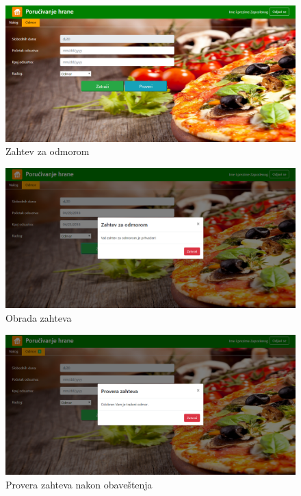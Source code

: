  \begin{figure}[!h]
    \includegraphics[width=1\textwidth]{slike/odmor.png}
    \caption{Zahtev za odmorom} %
    \label{fig:slika_odmor}
\end{figure}
 \begin{figure}[!h]
    \includegraphics[width=1\textwidth]{slike/odmor1.png}
    \caption{Obrada zahteva} %
    \label{fig:slika_obrada1}
\end{figure}

 \begin{figure}[!h]
    \includegraphics[width=1\textwidth]{slike/odmor2.png}
    \caption{Provera zahteva nakon obaveštenja} %
    \label{fig:slika_obrada2}
\end{figure}
 
